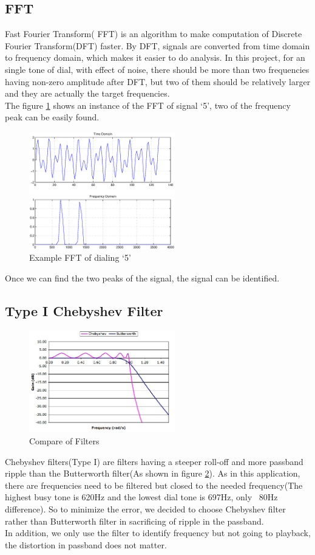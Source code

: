 \documentclass[journal]{./sty/IEEEtran}
\let\MYoriglatexcaption\caption
\renewcommand{\caption}[2][\relax]{\MYoriglatexcaption[#2]{#2}}
\begin{document}
\subsection{FFT}
Fast Fourier Transform( FFT) is an algorithm to make computation of Discrete Fourier Transform(DFT) faster. By DFT, signals are converted from time domain to frequency domain, which makes it easier to do analysis. In this project, for an single tone of dial, with effect of noise, there should be more than two frequencies having non-zero amplitude after DFT, but two of them should be relatively larger and they are actually the target frequencies.\\
\indent The figure \ref{fig:dail5} shows an instance of the FFT of signal `5', two of the frequency peak can be easily found.
\begin{figure}[!t]
\centering
\includegraphics[width=2.5in]{./pic/dig5.eps}
\caption{Example FFT of dialing `5'}\label{fig:dail5}
\end{figure}
Once we can find the two peaks of the signal, the signal can be identified.

\subsection{Type I Chebyshev Filter}
\begin{figure}[!t]
\centering
\includegraphics[width=2.5in]{./pic/cvb.jpg}
\caption{Compare of Filters}\label{fig:cvb}
\end{figure}
Chebyshev filters(Type I) are filters having a steeper roll-off and more passband ripple than the Butterworth filter(As shown in figure \ref{fig:cvb}). As in this application, there are frequencies need to be filtered but closed to the needed frequency(The highest busy tone is 620Hz and the lowest dial tone is 697Hz, only ~80Hz difference). So to minimize the error, we decided to choose Chebyshev filter rather than Butterworth filter in sacrificing of ripple in the passband.\\ 
\indent In addition, we only use the filter to identify frequency but not going to playback, the distortion in passband does not matter.
\end{document}

